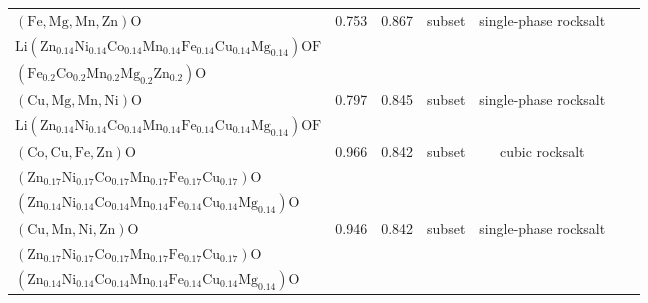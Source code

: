 \begin{table}
{\begin{tabular}{lcccccr}
$(\mathrm{Fe},\mathrm{Mg},\mathrm{Mn},\mathrm{Zn})\mathrm{O}$ & 0.753 & 0.867 & subset & single-phase rocksalt & \makecell{$(\mathrm{Zn}_{0.14}\mathrm{Ni}_{0.14}\mathrm{Co}_{0.14}\mathrm{Mn}_{0.14}\mathrm{Fe}_{0.14}\mathrm{Cu}_{0.14}\mathrm{Mg}_{0.14})\mathrm{O}$\\
$\mathrm{Li}(\mathrm{Zn}_{0.14}\mathrm{Ni}_{0.14}\mathrm{Co}_{0.14}\mathrm{Mn}_{0.14}\mathrm{Fe}_{0.14}\mathrm{Cu}_{0.14}\mathrm{Mg}_{0.14})\mathrm{OF}$\\
$(\mathrm{Fe}_{0.2}\mathrm{Co}_{0.2}\mathrm{Mn}_{0.2}\mathrm{Mg}_{0.2}\mathrm{Zn}_{0.2})\mathrm{O}$} & ~\cite{Lin_MechanochemicalSynthesis_JournalofMaterialsScience_2020,Dey_RocksaltNanocrystals_JournaloftheAmericanChemicalSociety_2025} \\
$(\mathrm{Cu},\mathrm{Mg},\mathrm{Mn},\mathrm{Ni})\mathrm{O}$ & 0.797 & 0.845 & subset & single-phase rocksalt & \makecell{$(\mathrm{Zn}_{0.14}\mathrm{Ni}_{0.14}\mathrm{Co}_{0.14}\mathrm{Mn}_{0.14}\mathrm{Fe}_{0.14}\mathrm{Cu}_{0.14}\mathrm{Mg}_{0.14})\mathrm{O}$\\
$\mathrm{Li}(\mathrm{Zn}_{0.14}\mathrm{Ni}_{0.14}\mathrm{Co}_{0.14}\mathrm{Mn}_{0.14}\mathrm{Fe}_{0.14}\mathrm{Cu}_{0.14}\mathrm{Mg}_{0.14})\mathrm{OF}$} & ~\cite{Lin_MechanochemicalSynthesis_JournalofMaterialsScience_2020} \\
$(\mathrm{Co},\mathrm{Cu},\mathrm{Fe},\mathrm{Zn})\mathrm{O}$ & 0.966 & 0.842 & subset & cubic rocksalt & \makecell{$\mathrm{Fe}_{0.2}\mathrm{Co}_{0.2}\mathrm{Ni}_{0.2}\mathrm{Cu}_{0.2}\mathrm{Zn}_{0.2}\mathrm{O}$\\
$(\mathrm{Zn}_{0.17}\mathrm{Ni}_{0.17}\mathrm{Co}_{0.17}\mathrm{Mn}_{0.17}\mathrm{Fe}_{0.17}\mathrm{Cu}_{0.17})\mathrm{O}$\\
$(\mathrm{Zn}_{0.14}\mathrm{Ni}_{0.14}\mathrm{Co}_{0.14}\mathrm{Mn}_{0.14}\mathrm{Fe}_{0.14}\mathrm{Cu}_{0.14}\mathrm{Mg}_{0.14})\mathrm{O}$} & ~\cite{He_LithiumStorage_NanoResearch_2025,Lin_MechanochemicalSynthesis_JournalofMaterialsScience_2020,Gautam_SubstitutedCatalysts_CatalSciTechnol_2026} \\
$(\mathrm{Cu},\mathrm{Mn},\mathrm{Ni},\mathrm{Zn})\mathrm{O}$ & 0.946 & 0.842 & subset & single-phase rocksalt & \makecell{$(\mathrm{Zn}_{0.2}\mathrm{Ni}_{0.2}\mathrm{Co}_{0.2}\mathrm{Mn}_{0.2}\mathrm{Cu}_{0.2})\mathrm{O}$\\
$(\mathrm{Zn}_{0.17}\mathrm{Ni}_{0.17}\mathrm{Co}_{0.17}\mathrm{Mn}_{0.17}\mathrm{Fe}_{0.17}\mathrm{Cu}_{0.17})\mathrm{O}$\\
$(\mathrm{Zn}_{0.14}\mathrm{Ni}_{0.14}\mathrm{Co}_{0.14}\mathrm{Mn}_{0.14}\mathrm{Fe}_{0.14}\mathrm{Cu}_{0.14}\mathrm{Mg}_{0.14})\mathrm{O}$} & ~\cite{Lin_MechanochemicalSynthesis_JournalofMaterialsScience_2020} \\

\end{tabular}}
\end{table}
